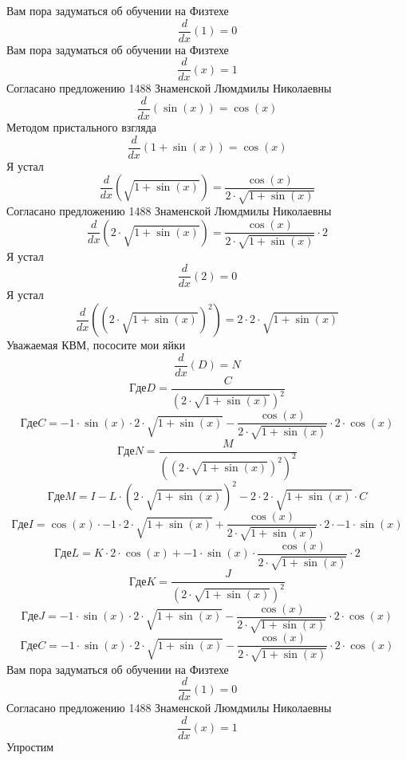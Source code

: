 \documentclass[12pt, a4paper]{article}
\begin{document}
Вам пора задуматься об обучении на Физтехе
\begin{equation}
\frac{d}{dx}(1) = 0
\end{equation}
Вам пора задуматься об обучении на Физтехе
\begin{equation}
\frac{d}{dx}(x) = 1
\end{equation}
Согласано предложению 1488 Знаменской Люмдмилы Николаевны
\begin{equation}
\frac{d}{dx}(\sin(x)) = \cos(x)
\end{equation}
Методом пристального взгляда
\begin{equation}
\frac{d}{dx}(1+\sin(x)) = \cos(x)
\end{equation}
Я устал
\begin{equation}
\frac{d}{dx}(\sqrt{1+\sin(x)}) = \frac{\cos(x)}{2 \cdot \sqrt{1+\sin(x)}}
\end{equation}
Согласано предложению 1488 Знаменской Люмдмилы Николаевны
\begin{equation}
\frac{d}{dx}(2 \cdot \sqrt{1+\sin(x)}) = \frac{\cos(x)}{2 \cdot \sqrt{1+\sin(x)}} \cdot 2
\end{equation}
Я устал
\begin{equation}
\frac{d}{dx}(2) = 0
\end{equation}
Я устал
\begin{equation}
\frac{d}{dx}({(2 \cdot \sqrt{1+\sin(x)})}^{2}) = 2 \cdot 2 \cdot \sqrt{1+\sin(x)}
\end{equation}
Уважаемая КВМ, пососите мои яйки
\begin{equation}
\frac{d}{dx}(D) = N
\end{equation}
$$Где D = \frac{C}{{(2 \cdot \sqrt{1+\sin(x)})}^{2}}$$
$$Где C = -1 \cdot \sin(x) \cdot 2 \cdot \sqrt{1+\sin(x)}-\frac{\cos(x)}{2 \cdot \sqrt{1+\sin(x)}} \cdot 2 \cdot \cos(x)$$
$$Где N = \frac{M}{{({(2 \cdot \sqrt{1+\sin(x)})}^{2})}^{2}}$$
$$Где M = I-L \cdot {(2 \cdot \sqrt{1+\sin(x)})}^{2}-2 \cdot 2 \cdot \sqrt{1+\sin(x)} \cdot C$$
$$Где I = \cos(x) \cdot -1 \cdot 2 \cdot \sqrt{1+\sin(x)}+\frac{\cos(x)}{2 \cdot \sqrt{1+\sin(x)}} \cdot 2 \cdot -1 \cdot \sin(x)$$
$$Где L = K \cdot 2 \cdot \cos(x)+-1 \cdot \sin(x) \cdot \frac{\cos(x)}{2 \cdot \sqrt{1+\sin(x)}} \cdot 2$$
$$Где K = \frac{J}{{(2 \cdot \sqrt{1+\sin(x)})}^{2}}$$
$$Где J = -1 \cdot \sin(x) \cdot 2 \cdot \sqrt{1+\sin(x)}-\frac{\cos(x)}{2 \cdot \sqrt{1+\sin(x)}} \cdot 2 \cdot \cos(x)$$
$$Где C = -1 \cdot \sin(x) \cdot 2 \cdot \sqrt{1+\sin(x)}-\frac{\cos(x)}{2 \cdot \sqrt{1+\sin(x)}} \cdot 2 \cdot \cos(x)$$
Вам пора задуматься об обучении на Физтехе
\begin{equation}
\frac{d}{dx}(1) = 0
\end{equation}
Согласано предложению 1488 Знаменской Люмдмилы Николаевны
\begin{equation}
\frac{d}{dx}(x) = 1
\end{equation}
Упростим
\end{document}
